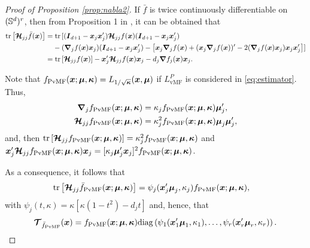 \documentclass[oneside,11pt]{article}
\begin{document}
\begin{proof}[Proof of Proposition \ref{prop:nabla2}]
If $\bar{f}$ is twice continuously differentiable on $\Sdr$, then from Proposition 1 in \cite{Garcia-Portugues2023}, it can be obtained that
\begin{align*}
    \tr{\bHcal_{jj}\bar{f}(\bx)}=&\;\mbox{tr}\, [(\bI_{d+1}-\bx_j\bx_j')\bHcal_{jj} f(\bx)(\bI_{d+1}-\bx_j\bx_j')\nonumber\\
    &-(\bnab_j f(\bx)\bx_j)(\bI_{d+1}-\bx_j\bx_j')-\big[\bx_j\bnab_j f(\bx)+(\bx_j\bnab_j f(\bx))'-2(\bnab_j f(\bx)\bx_j)\bx_j\bx_j'\big]]\nonumber\\
    =&\;\tr{\bHcal_{jj}f(\bx)}-\bx_j'\bHcal_{jj} f(\bx)\bx_j-d_j\bnab f_j(\bx)\bx_j.
\end{align*}

Note that $f_{\mathrm{PvMF}}(\bx;\bmu,\bkappa)=L_{1/\sqrt{\bkappa}}(\bx,\bmu)$ if $L_\mathrm{vMF}^P$ is considered in \eqref{eq:estimator}. Thus,
\begin{align*}
   \bnabla_j f_{\mathrm{PvMF}}(\bx;\bmu,\bkappa) &= \kappa_j f_{\mathrm{PvMF}}(\bx;\bmu,\bkappa) \bmu_{j}',\\
   \bHcal_{jj} f_{\mathrm{PvMF}}(\bx;\bmu,\bkappa) &= \kappa_j^2 f_{\mathrm{PvMF}}(\bx;\bmu,\bkappa) \bmu_{j}\bmu_{j}',
\end{align*}
and, then $\tr{\bHcal_{jj}f_{\mathrm{PvMF}}(\bx;\bmu,\bkappa)}= \kappa_j^2 f_{\mathrm{PvMF}}(\bx;\bmu,\bkappa)$ and $\bx_j'\bHcal_{jj} f_{\mathrm{PvMF}}(\bx;\bmu,\bkappa)\bx_j =\allowbreak [\kappa_j\bmu_{j}'\bx_j]^2 f_{\mathrm{PvMF}}(\bx;\bmu,\bkappa)$.

As a consequence, it follows that
\begin{align*}
    \tr{\bHcal_{jj}\bar{f}_{\mathrm{PvMF}}(\bx;\bmu,\bkappa)}=&\;\psi_j(\bx_j'\bmu_j,\kappa_j)f_{\mathrm{PvMF}}(\bx;\bmu,\bkappa),
\end{align*}
with $\psi_j(t,\kappa)=\kappa[\kappa(1-t^2)-d_jt]$ and, hence, that
\begin{align*}
    \bT_{\bar{f}_{\mathrm{PvMF}}}(\bx)=f_{\mathrm{PvMF}}(\bx;\bmu,\bkappa)\diag{\psi_1(\bx_1'\bmu_1,\kappa_1),\ldots,\psi_r(\bx_r'\bmu_r,\kappa_r)}.
\end{align*}
\end{proof}
\end{document}
